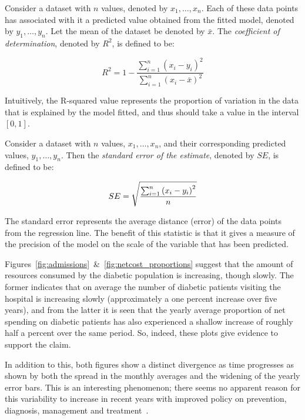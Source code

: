 \begin{definition}
    Consider a dataset with \(n\) values, denoted by \(x_1, \ldots, x_n\). Each
    of these data points has associated with it a predicted value obtained from
    the fitted model, denoted by \(y_1, \ldots, y_n\). Let the mean of the
    dataset be denoted by \(\bar x\). The \emph{coefficient of determination},
    denoted by \(R^2\), is defined to be:

    \[
        R^2 = 1 - \frac{\sum_{i=1}^{n} {\left(x_i - y_i\right)}^2}%
                       {\sum_{i=1}^{n} {\left(x_i - \bar x\right)}^2}
    \]

    Intuitively, the R-squared value represents the proportion of variation in
    the data that is explained by the model fitted, and thus should take a value
    in the interval \(\left[0, 1\right]\).
\end{definition}

\begin{definition}
    Consider a dataset with \(n\) values, \(x_1, \ldots, x_n\), and their
    corresponding predicted values, \(y_1, \ldots, y_n\). Then the
    \emph{standard error of the estimate}, denoted by \(SE\), is defined to be:

    \[
        SE = \sqrt{%
            \frac{\sum_{i=1}^{n} {\left(x_i - y_i\right)}^2}{n}
        }
    \]

    The standard error represents the average distance (error) of the data
    points from the regression line. The benefit of this statistic is that it
    gives a measure of the precision of the model on the scale of the variable
    that has been predicted.
\end{definition}

Figures~\ref{fig:admissions}~\&~\ref{fig:netcost_proportions} suggest that the
amount of resources consumed by the diabetic population is increasing, though
slowly. The former indicates that on average the number of diabetic patients
visiting the hospital is increasing slowly (approximately a one percent increase
over five years), and from the latter it is seen that the yearly average
proportion of net spending on diabetic patients has also experienced a shallow
increase of roughly half a percent over the same period. So, indeed, these plots
give evidence to support the claim.

In addition to this, both figures show a distinct divergence as time progresses
as shown by both the spread in the monthly averages and the widening of the
yearly error bars. This is an interesting phenomenon; there seems no apparent
reason for this variability to increase in recent years with improved policy on
prevention, diagnosis, management and treatment~\cite{NICE}.

